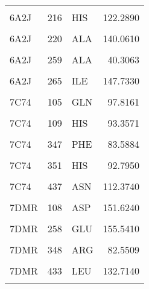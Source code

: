 \begin{table}
\begin{tabular}{lrlr}
			\cellcolor{gray!6}{6A2J} & \cellcolor{gray!6}{182} & \cellcolor{gray!6}{VAL} & \cellcolor{gray!6}{146.8970}\\
			6A2J & 216 & HIS & 122.2890\\
			\cellcolor{gray!6}{6A2J} & \cellcolor{gray!6}{217} & \cellcolor{gray!6}{ARG} & \cellcolor{gray!6}{54.8831}\\
			6A2J & 220 & ALA & 140.0610\\
			\addlinespace
			\cellcolor{gray!6}{6A2J} & \cellcolor{gray!6}{258} & \cellcolor{gray!6}{GLN} & \cellcolor{gray!6}{91.0438}\\
			6A2J & 259 & ALA & 40.3063\\
			\cellcolor{gray!6}{6A2J} & \cellcolor{gray!6}{261} & \cellcolor{gray!6}{SER} & \cellcolor{gray!6}{84.4336}\\
			6A2J & 265 & ILE & 147.7330\\
			\cellcolor{gray!6}{6A2J} & \cellcolor{gray!6}{278} & \cellcolor{gray!6}{HIS} & \cellcolor{gray!6}{124.6210}\\
			\addlinespace
			7C74 & 105 & GLN & 97.8161\\
			\cellcolor{gray!6}{7C74} & \cellcolor{gray!6}{108} & \cellcolor{gray!6}{ASP} & \cellcolor{gray!6}{160.5440}\\
			7C74 & 109 & HIS & 93.3571\\
			\cellcolor{gray!6}{7C74} & \cellcolor{gray!6}{258} & \cellcolor{gray!6}{GLU} & \cellcolor{gray!6}{160.0830}\\
			7C74 & 347 & PHE & 83.5884\\
			\addlinespace
			\cellcolor{gray!6}{7C74} & \cellcolor{gray!6}{348} & \cellcolor{gray!6}{ARG} & \cellcolor{gray!6}{78.0301}\\
			7C74 & 351 & HIS & 92.7950\\
			\cellcolor{gray!6}{7C74} & \cellcolor{gray!6}{433} & \cellcolor{gray!6}{LEU} & \cellcolor{gray!6}{124.6650}\\
			7C74 & 437 & ASN & 112.3740\\
			\cellcolor{gray!6}{7DMR} & \cellcolor{gray!6}{105} & \cellcolor{gray!6}{GLN} & \cellcolor{gray!6}{100.6130}\\
			\addlinespace
			7DMR & 108 & ASP & 151.6240\\
			\cellcolor{gray!6}{7DMR} & \cellcolor{gray!6}{109} & \cellcolor{gray!6}{HIS} & \cellcolor{gray!6}{93.5665}\\
			7DMR & 258 & GLU & 155.5410\\
			\cellcolor{gray!6}{7DMR} & \cellcolor{gray!6}{347} & \cellcolor{gray!6}{PHE} & \cellcolor{gray!6}{87.2067}\\
			7DMR & 348 & ARG & 82.5509\\
			\addlinespace
			\cellcolor{gray!6}{7DMR} & \cellcolor{gray!6}{351} & \cellcolor{gray!6}{HIS} & \cellcolor{gray!6}{96.7615}\\
			7DMR & 433 & LEU & 132.7140\\
			\cellcolor{gray!6}{7DMR} & \cellcolor{gray!6}{437} & \cellcolor{gray!6}{ASN} & \cellcolor{gray!6}{110.5710}\\
			\bottomrule
		\end{tabular}
	\end{table}
